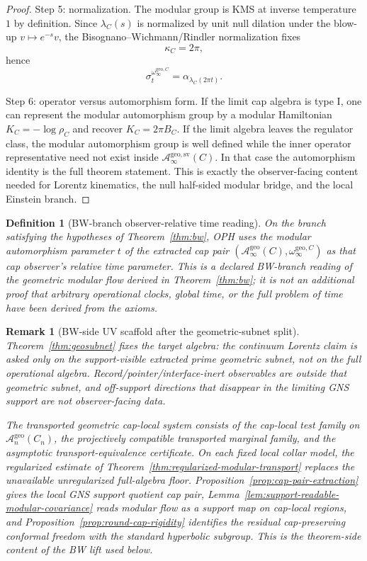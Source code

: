 \documentclass[11pt]{article}
\newtheorem{definition}[theorem]{Definition}
\newtheorem{remark}[theorem]{Remark}
\begin{document}
\begin{proof}
Step 5: normalization. The modular group is KMS at inverse temperature \(1\) by definition. Since \(\lambda_C(s)\) is normalized by unit null dilation under the blow-up \(v\mapsto e^{-s}v\), the Bisognano--Wichmann/Rindler normalization fixes
\[
\kappa_C=2\pi,
\]
hence
\[
\sigma_t^{\omega_\infty^{\mathrm{geo},C}}
=
\alpha_{\lambda_C(2\pi t)}.
\]

Step 6: operator versus automorphism form. If the limit cap algebra is type I, one can represent the modular automorphism group by a modular Hamiltonian \(K_C=-\log\rho_C\) and recover \(K_C=2\pi B_C\). If the limit algebra leaves the regulator class, the modular automorphism group is well defined while the inner operator representative need not exist inside \(\mathcal A_\infty^{\mathrm{geo,sv}}(C)\). In that case the automorphism identity is the full theorem statement. This is exactly the observer-facing content needed for Lorentz kinematics, the null half-sided modular bridge, and the local Einstein branch.
\end{proof}

\begin{definition}[BW-branch observer-relative time reading]\label{def:modulartime}
On the branch satisfying the hypotheses of Theorem~\ref{thm:bw}, OPH uses the modular
automorphism parameter \(t\) of the extracted cap pair
\((\mathcal A_\infty^{\mathrm{geo}}(C),\omega_\infty^{\mathrm{geo},C})\) as that cap
observer's relative time parameter. This is a declared BW-branch reading of the geometric
modular flow derived in Theorem~\ref{thm:bw}; it is not an additional proof that arbitrary
operational clocks, global time, or the full problem of time have been derived from the axioms.
\end{definition}

\begin{remark}[BW-side UV scaffold after the geometric-subnet split]
Theorem~\ref{thm:geosubnet} fixes the target algebra: the continuum Lorentz claim is asked only on the support-visible extracted prime geometric subnet, not on the full operational algebra. Record/pointer/interface-inert observables are outside that geometric subnet, and off-support directions that disappear in the limiting GNS support are not observer-facing data.

The transported geometric cap-local system consists of the cap-local test family on \(\mathcal A_n^{\mathrm{geo}}(C_n)\), the projectively compatible transported marginal family, and the asymptotic transport-equivalence certificate. On each fixed local collar model, the regularized estimate of Theorem~\ref{thm:regularized-modular-transport} replaces the unavailable unregularized full-algebra floor. Proposition~\ref{prop:cap-pair-extraction} gives the local GNS support quotient cap pair, Lemma~\ref{lem:support-readable-modular-covariance} reads modular flow as a support map on cap-local regions, and Proposition~\ref{prop:round-cap-rigidity} identifies the residual cap-preserving conformal freedom with the standard hyperbolic subgroup. This is the theorem-side content of the BW lift used below.
\end{remark}
\end{document}
